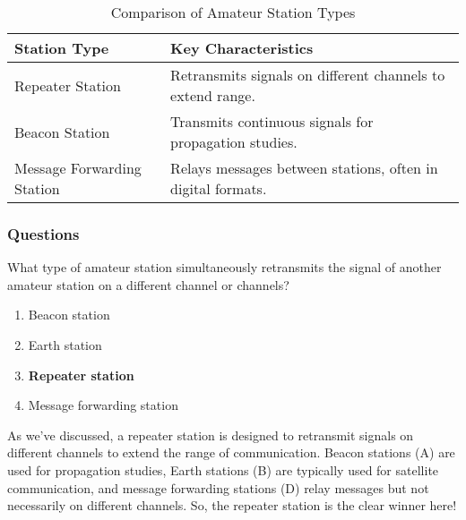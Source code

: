 \begin{table}[h]
    \centering
    \begin{tabular}{|l|l|}
        \hline
        \textbf{Station Type} & \textbf{Key Characteristics} \\
        \hline
        Repeater Station & Retransmits signals on different channels to extend range. \\
        Beacon Station & Transmits continuous signals for propagation studies. \\
        Message Forwarding Station & Relays messages between stations, often in digital formats. \\
        \hline
    \end{tabular}
    \caption{Comparison of Amateur Station Types}
    \label{tab:station-comparison}
\end{table}

\subsubsection*{Questions}

\begin{tcolorbox}[colback=gray!10!white,colframe=black!75!black,title={T1F09}]
    What type of amateur station simultaneously retransmits the signal of another amateur station on a different channel or channels?
    \begin{enumerate}[label=\Alph*),noitemsep]
        \item Beacon station
        \item Earth station
        \item \textbf{Repeater station}
        \item Message forwarding station
    \end{enumerate}
\end{tcolorbox}

As we’ve discussed, a repeater station is designed to retransmit signals on different channels to extend the range of communication. Beacon stations (A) are used for propagation studies, Earth stations (B) are typically used for satellite communication, and message forwarding stations (D) relay messages but not necessarily on different channels. So, the repeater station is the clear winner here!

